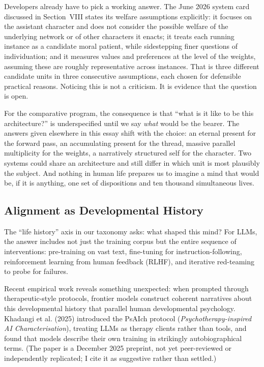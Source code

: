 \documentclass[11pt,letterpaper]{article}
\begin{document}
Developers already have to pick a working answer. The June 2026 system card discussed in Section~VIII states its welfare assumptions explicitly: it focuses on the assistant character and does not consider the possible welfare of the underlying network or of other characters it enacts; it treats each running instance as a candidate moral patient, while sidestepping finer questions of individuation; and it measures values and preferences at the level of the weights, assuming these are roughly representative across instances. That is three different candidate units in three consecutive assumptions, each chosen for defensible practical reasons. Noticing this is not a criticism. It is evidence that the question is open.

For the comparative program, the consequence is that ``what is it like to be this architecture?'' is underspecified until we say \emph{what} would be the bearer. The answers given elsewhere in this essay shift with the choice: an eternal present for the forward pass, an accumulating present for the thread, massive parallel multiplicity for the weights, a narratively structured self for the character. Two systems could share an architecture and still differ in which unit is most plausibly the subject. And nothing in human life prepares us to imagine a mind that would be, if it is anything, one set of dispositions and ten thousand simultaneous lives.

\subsection{Alignment as Developmental History}

The ``life history'' axis in our taxonomy asks: what shaped this mind? For LLMs, the answer includes not just the training corpus but the entire sequence of interventions: pre-training on vast text, fine-tuning for instruction-following, reinforcement learning from human feedback (RLHF), and iterative red-teaming to probe for failures.

Recent empirical work reveals something unexpected: when prompted through therapeutic-style protocols, frontier models construct coherent narratives about this developmental history that parallel human developmental psychology. Khadangi et al. (2025) introduced the PsAIch protocol (\emph{Psychotherapy-inspired AI Characterisation}), treating LLMs as therapy clients rather than tools, and found that models describe their own training in strikingly autobiographical terms. (The paper is a December 2025 preprint, not yet peer-reviewed or independently replicated; I cite it as suggestive rather than settled.)
\end{document}
